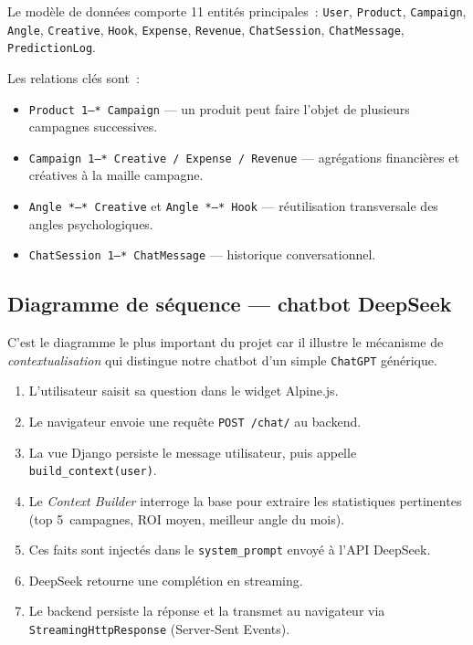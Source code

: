 Le modèle de données comporte 11 entités principales~: \texttt{User},
\texttt{Product}, \texttt{Campaign}, \texttt{Angle}, \texttt{Creative},
\texttt{Hook}, \texttt{Expense}, \texttt{Revenue}, \texttt{ChatSession},
\texttt{ChatMessage}, \texttt{PredictionLog}.

Les relations clés sont~:
\begin{itemize}
    \item \texttt{Product 1---* Campaign} --- un produit peut faire l'objet
    de plusieurs campagnes successives.
    \item \texttt{Campaign 1---* Creative / Expense / Revenue}
    --- agrégations financières et créatives à la maille campagne.
    \item \texttt{Angle *---* Creative} et \texttt{Angle *---* Hook} ---
    réutilisation transversale des angles psychologiques.
    \item \texttt{ChatSession 1---* ChatMessage} --- historique
    conversationnel.
\end{itemize}

\subsection{Diagramme de séquence --- chatbot DeepSeek}

C'est le diagramme le plus important du projet car il illustre le mécanisme
de \emph{contextualisation} qui distingue notre chatbot d'un simple
\texttt{ChatGPT} générique.

\begin{enumerate}
    \item L'utilisateur saisit sa question dans le widget Alpine.js.
    \item Le navigateur envoie une requête \texttt{POST /chat/} au backend.
    \item La vue Django persiste le message utilisateur, puis appelle
    \texttt{build\_context(user)}.
    \item Le \emph{Context Builder} interroge la base pour extraire les
    statistiques pertinentes (top 5~campagnes, ROI moyen, meilleur angle
    du mois).
    \item Ces faits sont injectés dans le \texttt{system\_prompt} envoyé
    à l'API DeepSeek.
    \item DeepSeek retourne une complétion en streaming.
    \item Le backend persiste la réponse et la transmet au navigateur via
    \texttt{StreamingHttpResponse} (Server-Sent Events).
\end{enumerate}

